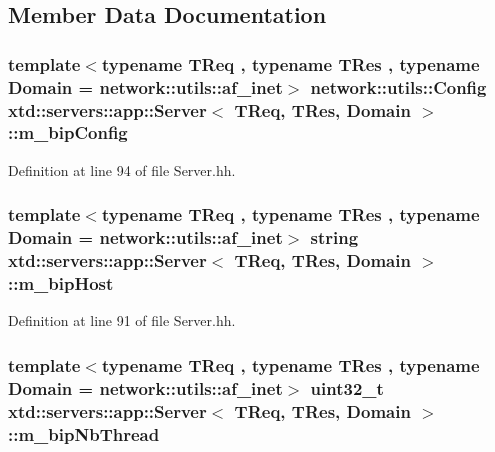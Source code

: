 \subsection{Member Data Documentation}
\hypertarget{classxtd_1_1servers_1_1app_1_1Server_a62a3f48e47eba551b53d0bef859aa906}{
\subsubsection[{m\-\_\-bip\-Config}]{\setlength{\rightskip}{0pt plus 5cm}template$<$typename T\-Req , typename T\-Res , typename Domain  = network\-::utils\-::af\-\_\-inet$>$ network\-::utils\-::\-Config {\bf xtd\-::servers\-::app\-::\-Server}$<$ T\-Req, T\-Res, Domain $>$\-::m\-\_\-bip\-Config\hspace{0.3cm}{\ttfamily [protected]}}}\label{classxtd_1_1servers_1_1app_1_1Server_a62a3f48e47eba551b53d0bef859aa906}


Definition at line 94 of file Server.\-hh.

\hypertarget{classxtd_1_1servers_1_1app_1_1Server_a08752041a6fc98289ad93c93c1d4fd75}{
\subsubsection[{m\-\_\-bip\-Host}]{\setlength{\rightskip}{0pt plus 5cm}template$<$typename T\-Req , typename T\-Res , typename Domain  = network\-::utils\-::af\-\_\-inet$>$ string {\bf xtd\-::servers\-::app\-::\-Server}$<$ T\-Req, T\-Res, Domain $>$\-::m\-\_\-bip\-Host\hspace{0.3cm}{\ttfamily [protected]}}}\label{classxtd_1_1servers_1_1app_1_1Server_a08752041a6fc98289ad93c93c1d4fd75}


Definition at line 91 of file Server.\-hh.

\hypertarget{classxtd_1_1servers_1_1app_1_1Server_a4e7cb3d792a27b1572aa775f8f0018f3}{
\subsubsection[{m\-\_\-bip\-Nb\-Thread}]{\setlength{\rightskip}{0pt plus 5cm}template$<$typename T\-Req , typename T\-Res , typename Domain  = network\-::utils\-::af\-\_\-inet$>$ uint32\-\_\-t {\bf xtd\-::servers\-::app\-::\-Server}$<$ T\-Req, T\-Res, Domain $>$\-::m\-\_\-bip\-Nb\-Thread\hspace{0.3cm}{\ttfamily [protected]}}}\label{classxtd_1_1servers_1_1app_1_1Server_a4e7cb3d792a27b1572aa775f8f0018f3}


